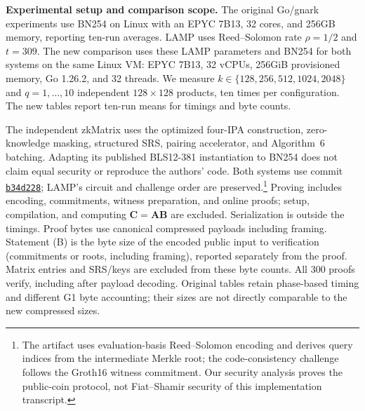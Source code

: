\documentclass[conference,compsoc]{IEEEtran}
\makeatletter
\newcommand{\mat}{\mathbf}          %
\newcommand{\protocol}{\textsf{LAMP}}   %
\theoremstyle{plain}
\theoremstyle{definition}
\theoremstyle{remark}
\providecommand{\DIFaddtex}[1]{{\protect\color{blue}\uwave{#1}}} %
\providecommand{\DIFdeltex}[1]{{\protect\color{red}\sout{#1}}} %
\providecommand{\DIFaddbegin}{} %
\providecommand{\DIFaddend}{} %
\providecommand{\DIFdelbegin}{} %
\providecommand{\DIFdelend}{} %
\providecommand{\DIFadd}[1]{\texorpdfstring{\DIFaddtex{#1}}{#1}} %
\providecommand{\DIFdel}[1]{\texorpdfstring{\DIFdeltex{#1}}{}} %
\let\sout@orig\sout %
\renewcommand{\sout}[1]{\ifmmode\text{\sout@orig{\ensuremath{#1}}}\else\sout@orig{#1}\fi} %
\renewcommand{\DIFaddtex}[1]{{\protect\color{DiffBlue}#1}}
\renewcommand{\DIFdeltex}[1]{}
\makeatother
\begin{document}
\noindent\textbf{Experimental setup \DIFaddbegin \DIFadd{and comparison scope}\DIFaddend .}
\DIFdelbegin \DIFdel{We implement both \(\protocol\) and the Freivalds baseline in Gousing gnark , with BN254 as the elliptic curve.  
All experiments were run on a Linux server with an AMD }\DIFdelend \DIFaddbegin \DIFadd{The original Go/gnark experiments use BN254 on Linux with an }\DIFaddend EPYC 7B13\DIFdelbegin \DIFdel{CPU with }\DIFdelend \DIFaddbegin \DIFadd{,
}\DIFaddend 32 cores\DIFaddbegin \DIFadd{, }\DIFaddend and 256GB \DIFdelbegin \DIFdel{of memory.
Each experiment was repeated ten times }\DIFdelend \DIFaddbegin \DIFadd{memory, reporting ten-run averages. LAMP uses
Reed--Solomon rate \(\rho=1/2\) and \(t=309\). The new comparison uses these
LAMP parameters and BN254 for both systems on the same Linux VM: EPYC 7B13}\DIFaddend ,
\DIFaddbegin \DIFadd{32 vCPUs, 256GiB provisioned memory, Go 1.26.2, and 32 threads. We measure
\(k\in\{128,256,512,1024,2048\}\) }\DIFaddend and \DIFdelbegin \DIFdel{we report the average over these runs. We use a Reed--Solomon code of rate \(\rho=1/2\) and set the number of sampled positions to \(t=\ensuremath{309}\). \
}\DIFdelend \DIFaddbegin \DIFadd{\(q=1,\ldots,10\) independent
\(128\times128\) products, ten times per configuration. The new tables report
ten-run means for timings and byte counts.
}\DIFaddend 

\DIFaddbegin \DIFadd{The independent zkMatrix uses the optimized four-IPA construction,
zero-knowledge masking, structured SRS, pairing accelerator, and Algorithm~6
batching. Adapting its published BLS12-381 instantiation to BN254 does not
claim equal security or reproduce the authors' code. Both systems use commit
}\href{https://github.com/lysias9049/LAMP-artifact/tree/b34d2287c30730a3990d92630185a0a792a2897f}{\texttt{\DIFadd{b34d228}}}\DIFadd{;
LAMP's circuit and challenge order are preserved.}\footnote{\DIFadd{The artifact uses
evaluation-basis Reed--Solomon encoding and derives query indices from the
intermediate Merkle root; the code-consistency challenge follows the Groth16
witness commitment. Our security analysis proves the public-coin protocol,
not Fiat--Shamir security of this implementation transcript.}}
\DIFadd{Proving includes encoding, commitments, witness preparation, and online proofs;
setup, compilation, and computing \(\mat C=\mat A\mat B\) are excluded.
Serialization is outside the timings. Proof bytes use canonical compressed
payloads including framing. Statement (B) is the byte size of the encoded
public input to verification (commitments or roots, including framing),
reported separately from the proof. Matrix entries and SRS/keys are excluded
from these byte counts. All 300 proofs verify, including after payload decoding. Original
tables retain phase-based timing and different G1 byte accounting; their sizes
are not directly comparable to the new compressed sizes.
}
\end{document}
